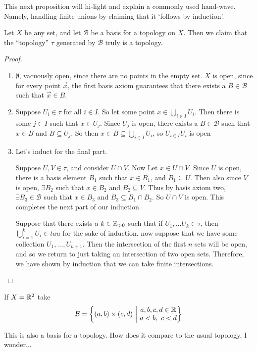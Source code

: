 \documentclass[12pt, twosided]{article}
\begin{document}
This next proposition will hi-light and explain a commonly used hand-wave. Namely, handling finite unions by claiming that it `follows by induction'.
\begin{prop}
  Let \(X\) be any set, and let \(\mathcal{B}\) be a basis for a topology on \(X\). Then we claim that the ``topology'' \(\tau\) generated by \(\mathcal{B}\) truly is a topology.
\end{prop}
\begin{proof}
  \begin{enumerate}
  \item \(\emptyset\), vacuously open, since there are no points in the empty set.
    \(X\) is open, since for every point \(\vec{x}\), the first basis axiom guarantees that there exists a \(B \in \mathcal{B}\) such that \(\vec{x} \in B\).
  \item Suppose \(U_i \in \tau\) for all \(i \in I\). So let some point \(x \in \bigcup_{i \in I} U_i\). Then there is some \(j \in I\) such that \(x \in U_j\). Since \(U_j\) is open, there exists a \(B \in \mathcal{B}\) such that \(x \in B\) and \(B \subseteq U_j\). So then \(x \in B \subseteq \bigcup_{i \in I}U_i\), so \(U_{i \in I} U_i\) is open
  \item Let's induct for the final part.

    Suppose \(U, V \in \tau\), and consider \(U \cap V\). Now Let \(x \in U \cap V\). Since \(U\) is open, there is a basis element \(B_1\) such that \(x \in B_1\), and \(B_1 \subseteq U\). Then also since \(V\) is open, \(\exists B_2\) such that \(x \in B_2\) and \(B_2 \subseteq V\). Thus by basis axiom two, \(\exists B_3 \in \mathcal{B}\) such that \(x \in B_3\) and \(B_3 \subseteq B_1 \cap B_2\). So \(U \cap V\) is open. This completes the next part of our induction.

    Suppose that there exists a \(k \in \mathbb{Z}_{>0}\) such that if \(U_1, \ldots U_k \in \tau\), then \(\bigcup_{i = 1}^k U_i \in tau\) for the sake of induction. now suppose that we have some collection \(U_1, \ldots, U_{n+1}\). Then the intersection of the first \(n\) sets will be open, and so we return to just taking an intersection of two open sets. Therefore, we have shown by induction that we can take finite intersections.
  \end{enumerate}
\end{proof}

\begin{exa}
  If \(X = \mathbb{R}^2\) take \[\mathcal{B} = \opn (a, b) \times (c, d)\ \middle\vert\ \begin{matrix} a, b, c, d \in \R \\ a < b, \ c < d \end{matrix} \cls\]

  This is also a basis for a topology. How does it compare to the usual topology, I wonder...
\end{exa}
\end{document}
